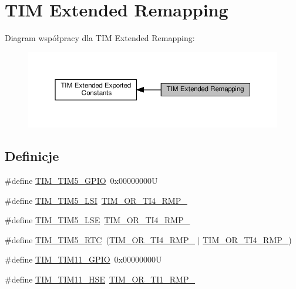 \hypertarget{group___t_i_m_ex___remap}{}\section{T\+IM Extended Remapping}
\label{group___t_i_m_ex___remap}
Diagram współpracy dla T\+IM Extended Remapping\+:\nopagebreak
\begin{figure}[H]
\begin{center}
\leavevmode
\includegraphics[width=350pt]{group___t_i_m_ex___remap}
\end{center}
\end{figure}
\subsection*{Definicje}
\begin{DoxyCompactItemize}
\item 
\#define \hyperlink{group___t_i_m_ex___remap_ga8525d77a5f6fea05530e812e991e4d6d}{T\+I\+M\+\_\+\+T\+I\+M5\+\_\+\+G\+P\+IO}~0x00000000U
\item 
\#define \hyperlink{group___t_i_m_ex___remap_ga62000fc12a4ed5909723b881533a2f93}{T\+I\+M\+\_\+\+T\+I\+M5\+\_\+\+L\+SI}~\hyperlink{group___peripheral___registers___bits___definition_ga9aea4f8a0abedbf08bb1e686933c1120}{T\+I\+M\+\_\+\+O\+R\+\_\+\+T\+I4\+\_\+\+R\+M\+P\+\_}
\item 
\#define \hyperlink{group___t_i_m_ex___remap_ga9f09de021d2f68730c952b4f0ebb82bc}{T\+I\+M\+\_\+\+T\+I\+M5\+\_\+\+L\+SE}~\hyperlink{group___peripheral___registers___bits___definition_gaa2a46aa18f15f2074b93233a18e85629}{T\+I\+M\+\_\+\+O\+R\+\_\+\+T\+I4\+\_\+\+R\+M\+P\+\_}
\item 
\#define \hyperlink{group___t_i_m_ex___remap_ga93e312581ffb28601b36b4f8b240df79}{T\+I\+M\+\_\+\+T\+I\+M5\+\_\+\+R\+TC}~(\hyperlink{group___peripheral___registers___bits___definition_gaa2a46aa18f15f2074b93233a18e85629}{T\+I\+M\+\_\+\+O\+R\+\_\+\+T\+I4\+\_\+\+R\+M\+P\+\_} $\vert$ \hyperlink{group___peripheral___registers___bits___definition_ga9aea4f8a0abedbf08bb1e686933c1120}{T\+I\+M\+\_\+\+O\+R\+\_\+\+T\+I4\+\_\+\+R\+M\+P\+\_})
\item 
\#define \hyperlink{group___t_i_m_ex___remap_gac8a0bac87924350651da1957081bc9ae}{T\+I\+M\+\_\+\+T\+I\+M11\+\_\+\+G\+P\+IO}~0x00000000U
\item 
\#define \hyperlink{group___t_i_m_ex___remap_ga3b08e8165670e3034401099aada7712d}{T\+I\+M\+\_\+\+T\+I\+M11\+\_\+\+H\+SE}~\hyperlink{group___peripheral___registers___bits___definition_ga98d9cdc55111a548e48df0819922852b}{T\+I\+M\+\_\+\+O\+R\+\_\+\+T\+I1\+\_\+\+R\+M\+P\+\_}
\end{DoxyCompactItemize}


